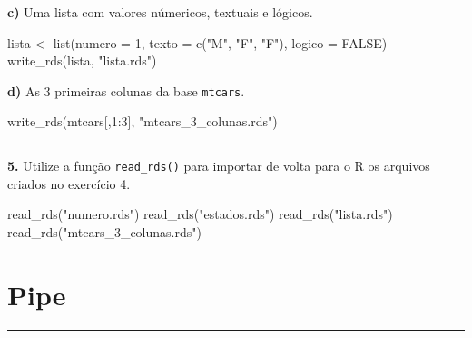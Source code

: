 \documentclass[
]{book}
\newenvironment{Shaded}{\begin{snugshade}}{\end{snugshade}}
\newcommand{\AttributeTok}[1]{\textcolor[rgb]{0.77,0.63,0.00}{#1}}
\newcommand{\ConstantTok}[1]{\textcolor[rgb]{0.00,0.00,0.00}{#1}}
\newcommand{\DecValTok}[1]{\textcolor[rgb]{0.00,0.00,0.81}{#1}}
\newcommand{\FunctionTok}[1]{\textcolor[rgb]{0.00,0.00,0.00}{#1}}
\newcommand{\NormalTok}[1]{#1}
\newcommand{\OtherTok}[1]{\textcolor[rgb]{0.56,0.35,0.01}{#1}}
\newcommand{\SpecialCharTok}[1]{\textcolor[rgb]{0.00,0.00,0.00}{#1}}
\newcommand{\StringTok}[1]{\textcolor[rgb]{0.31,0.60,0.02}{#1}}
\begin{document}
\textbf{c)} Uma lista com valores númericos, textuais e lógicos.

\begin{Shaded}
\begin{Highlighting}[]
\NormalTok{lista }\OtherTok{\textless{}{-}} \FunctionTok{list}\NormalTok{(}\AttributeTok{numero =} \DecValTok{1}\NormalTok{, }\AttributeTok{texto =} \FunctionTok{c}\NormalTok{(}\StringTok{"M"}\NormalTok{, }\StringTok{"F"}\NormalTok{, }\StringTok{"F"}\NormalTok{), }\AttributeTok{logico =} \ConstantTok{FALSE}\NormalTok{)}
\FunctionTok{write\_rds}\NormalTok{(lista, }\StringTok{"lista.rds"}\NormalTok{)}
\end{Highlighting}
\end{Shaded}

\textbf{d)} As 3 primeiras colunas da base \texttt{mtcars}.

\begin{Shaded}
\begin{Highlighting}[]
\FunctionTok{write\_rds}\NormalTok{(mtcars[,}\DecValTok{1}\SpecialCharTok{:}\DecValTok{3}\NormalTok{], }\StringTok{"mtcars\_3\_colunas.rds"}\NormalTok{)}
\end{Highlighting}
\end{Shaded}

\begin{center}\rule{0.5\linewidth}{0.5pt}\end{center}

\textbf{5.} Utilize a função \texttt{read\_rds()} para importar de volta para o R os arquivos criados no exercício 4.

\begin{Shaded}
\begin{Highlighting}[]
\FunctionTok{read\_rds}\NormalTok{(}\StringTok{"numero.rds"}\NormalTok{)}
\FunctionTok{read\_rds}\NormalTok{(}\StringTok{"estados.rds"}\NormalTok{)}
\FunctionTok{read\_rds}\NormalTok{(}\StringTok{"lista.rds"}\NormalTok{)}
\FunctionTok{read\_rds}\NormalTok{(}\StringTok{"mtcars\_3\_colunas.rds"}\NormalTok{)}
\end{Highlighting}
\end{Shaded}

\hypertarget{pipe-1}{%
\section{Pipe}\label{pipe-1}}

\begin{center}\rule{0.5\linewidth}{0.5pt}\end{center}
\end{document}
